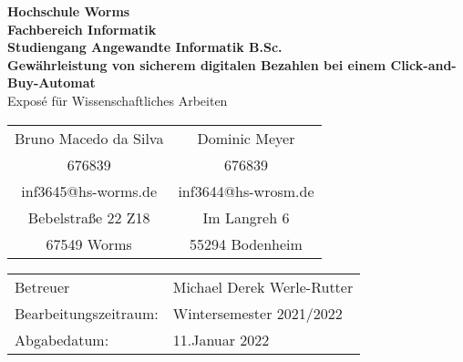 \begin{titlepage}
    \vspace*{2mm}
    \begin{center}
        \Large
        \textbf{Hochschule Worms}\\
        \textbf{Fachbereich Informatik}\\
        \textbf{Studiengang Angewandte Informatik B.Sc.}\\
        \vspace{1cm}
        \textbf{Gewährleistung von sicherem digitalen Bezahlen bei einem Click-and-Buy-Automat}\\
        \vspace{1cm}
        \large
        Exposé für Wissenschaftliches Arbeiten\\
        \vspace{4cm}
        \begin {table}[ht]
            \centering
            \begin{tabular}{c c}
                Bruno Macedo da Silva    & Dominic Meyer \\ 
                676839                   & 676839         \\
                inf3645@hs-worms.de      & inf3644@hs-wrosm.de \\
                Bebelstraße 22 Z18       & Im Langreh 6 \\
                67549 Worms              & 55294 Bodenheim \\
            \end{tabular}
        \end {table}
        \vspace{2cm}
        \large
        \vspace{1cm}
         \begin {table}[ht]
             \centering
             \begin{tabular}{l l}
                Betreuer                & Michael Derek Werle-Rutter \\
                Bearbeitungszeitraum:   & Wintersemester 2021/2022 \\
                Abgabedatum:            & 11.Januar 2022 \\
             \end{tabular}
         \end {table}
    \end{center}
    \normalsize
    \vfill
 


\end{titlepage}